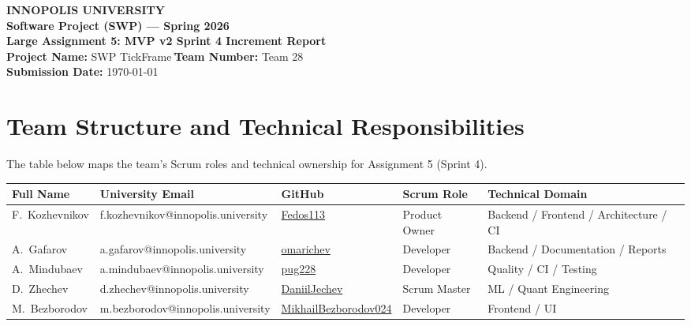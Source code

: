\documentclass[11pt,a4paper]{article}
\begin{document}
\begin{center}
    {\Large\textbf{INNOPOLIS UNIVERSITY}} \\
    \vspace{0.1cm}
    {\Large\textbf{Software Project (SWP) --- Spring 2026}} \\
    \vspace{0.5cm}
    \textbf{Large Assignment 5: MVP v2 Sprint 4 Increment Report} \\
    \vspace{0.3cm}
    \textbf{Project Name:} SWP TickFrame \quad \| \quad \textbf{Team Number:} Team 28 \\
    \textbf{Submission Date:} \today
\end{center}
\vspace{0.5cm}

\section{Team Structure and Technical Responsibilities}
The table below maps the team's Scrum roles and technical ownership for Assignment 5 (Sprint 4).
\vspace{0.2cm}

\begin{table}[h!]
\centering
\small
\begin{tabular}{lllll}
\toprule
\textbf{Full Name} & \textbf{University Email} & \textbf{GitHub} & \textbf{Scrum Role} & \textbf{Technical Domain} \\
\midrule
F.~Kozhevnikov & f.kozhevnikov@innopolis.university & \href{https://github.com/Fedos113}{Fedos113} & Product Owner & Backend / Frontend / Architecture / CI \\
A.~Gafarov & a.gafarov@innopolis.university & \href{https://github.com/omarichev}{omarichev} & Developer & Backend / Documentation / Reports \\
A.~Mindubaev & a.mindubaev@innopolis.university & \href{https://github.com/pug228}{pug228} & Developer & Quality / CI / Testing \\
D.~Zhechev & d.zhechev@innopolis.university & \href{https://github.com/DaniilJechev}{DaniilJechev} & Scrum Master & ML / Quant Engineering \\
M.~Bezborodov & m.bezborodov@innopolis.university & \href{https://github.com/MikhailBezborodov024}{MikhailBezborodov024} & Developer & Frontend / UI \\
\bottomrule
\end{tabular}
\end{table}
\end{document}
